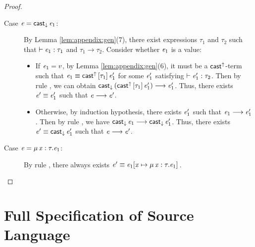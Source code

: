 \begin{proof}
\begin{description}
\begin{itemize}
    		\end{itemize}
		\item[Case $\mathit{e}=\mathsf{cast}_{\downarrow} \, \mathit{e_{{\mathrm{1}}}}$:] By Lemma \ref{lem:appendix:gen}(7), there exist expressions $\tau_{{\mathrm{1}}}$ and $\tau_{{\mathrm{2}}}$ such that $\vdash  \mathit{e_{{\mathrm{1}}}}  :  \tau_{{\mathrm{1}}}$ and $\tau_{{\mathrm{1}}}  \longrightarrow  \tau_{{\mathrm{2}}}$. Consider whether $\mathit{e_{{\mathrm{1}}}}$ is a value:
		     \begin{itemize}
    		    \item If $\mathit{e_{{\mathrm{1}}}}=v$, by Lemma \ref{lem:appendix:gen}(6), it must be a $ \mathsf{cast}^{\uparrow} $-term such that $\mathit{e_{{\mathrm{1}}}}  \equiv  \mathsf{cast}^{\uparrow} \, [  \tau_{{\mathrm{1}}}  ] \,  \mathit{e'_{{\mathrm{1}}}}$ for some $\mathit{e'_{{\mathrm{1}}}}$ satisfying $\vdash  \mathit{e'_{{\mathrm{1}}}}  :  \tau_{{\mathrm{2}}}$. Then by rule , we can obtain $\mathsf{cast}_{\downarrow} \, (  \mathsf{cast}^{\uparrow} \, [  \tau_{{\mathrm{1}}}  ] \,  \mathit{e'_{{\mathrm{1}}}}  )  \longrightarrow  \mathit{e'_{{\mathrm{1}}}}$. Thus, there exists $\mathit{e'}  \equiv  \mathit{e'_{{\mathrm{1}}}}$ such that $\mathit{e}  \longrightarrow  \mathit{e'}$.
    		    \item Otherwise, by induction hypothesis, there exists $\mathit{e'_{{\mathrm{1}}}}$ such that $\mathit{e_{{\mathrm{1}}}}  \longrightarrow  \mathit{e'_{{\mathrm{1}}}}$. Then by rule , we have $\mathsf{cast}_{\downarrow} \, \mathit{e_{{\mathrm{1}}}}  \longrightarrow  \mathsf{cast}_{\downarrow} \, \mathit{e'_{{\mathrm{1}}}}$. Thus, there exists $\mathit{e'}  \equiv  \mathsf{cast}_{\downarrow} \, \mathit{e'_{{\mathrm{1}}}}$ such that $\mathit{e}  \longrightarrow  \mathit{e'}$.
    		\end{itemize}
		\item[Case $\mathit{e}=\mu \, \mathit{x}  :  \tau  .  \mathit{e_{{\mathrm{1}}}}$:] By rule , there always exists $\mathit{e'}  \equiv  \mathit{e_{{\mathrm{1}}}}  [  \mathit{x}  \mapsto  \mu \, \mathit{x}  :  \tau  .  \mathit{e_{{\mathrm{1}}}}  ] \,$.
    \end{description}
\end{proof}

\section{Full Specification of Source Language}
